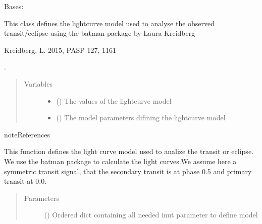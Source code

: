 \documentclass[a4paper,10pt,english]{sphinxmanual}
\begin{document}
\begin{fulllineitems}
\label{\detokenize{cascade.exoplanet_tools:cascade.exoplanet_tools.exoplanet_tools.batman_model}}
Bases: 

This class defines the lightcurve model used to analyse the observed
transit/eclipse using the batman package by Laura Kreidberg %
\begin{footnote}[1]\sphinxAtStartFootnote
Kreidberg, L. 2015, PASP 127, 1161
%
\end{footnote}.
\begin{quote}\begin{description}
\item[{Variables}] \leavevmode\begin{itemize}
\item {} 
 () \textendash{} The values of the lightcurve model

\item {} 
 () \textendash{} The model parameters difining the lightcurve model

\end{itemize}

\end{description}\end{quote}

\begin{sphinxadmonition}{note}{References}
\end{sphinxadmonition}

\begin{fulllineitems}
\label{\detokenize{cascade.exoplanet_tools:cascade.exoplanet_tools.exoplanet_tools.batman_model.define_batman_model}}
This function defines the light curve model used to analize the
transit or eclipse. We use the batman package to calculate the
light curves.We assume here a symmetric transit signal, that the
secondary transit is at phase 0.5 and primary transit at 0.0.
\begin{quote}\begin{description}
\item[{Parameters}] \leavevmode
{} () \textendash{} Ordered dict containing all needed inut parameter to define model


\end{description}
\end{quote}
\end{fulllineitems}
\end{fulllineitems}
\end{document}
